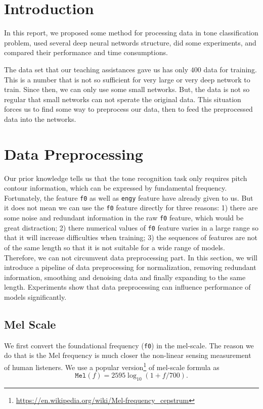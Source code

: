 \documentclass[a4paper]{article}
\begin{document}
\maketitle
\pagebreak

\section{Introduction}

In this report, we proposed some method for processing data in tone classification problem, used several deep neural networds structure, did some experiments, and compared their performance and time consumptions.

The data set that our teaching assistances gave us has only $400$ data for training. This is a number that is not so sufficient for very large or very deep network to train. Since then, we can only use some small networks. But, the data is not so regular that small networks can not sperate the original data. This situation forces us to find some way to preprocess our data, then to feed the preprocessed data into the networks.

\section{Data Preprocessing}

Our prior knowledge tells us that the tone recognition task only requires pitch contour information, which can be expressed by fundamental frequency. Fortunately, the feature \texttt{f0} as well as \texttt{engy} feature have already given to us. But it does not mean we can use the \texttt{f0} feature directly for three reasons: 1) there are some noise and redundant information in the raw \texttt{f0} feature, which would be great distraction; 2) there numerical values of \texttt{f0} feature varies in a large range so that it will increase difficulties when training; 3) the sequences of features are not of the same length so that it is not suitable for a wide range of models. Therefore, we can not circumvent data preprocessing part. In this section, we will introduce a pipeline of data preprocessing for normalization, removing redundant information, smoothing and denoising data and finally expanding to the same length. Experiments show that data preprocessing can influence performance of models significantly.
\subsection{Mel Scale}
We first convert the foundational frequency (\texttt{f0}) in the mel-scale. The reason we do that is the Mel frequency is much closer the non-linear sensing measurement of human listeners. We use a popular version\footnote{\url{https://en.wikipedia.org/wiki/Mel-frequency_cepstrum}} of mel-scale formula as
	\[\mathtt{Mel}(f) = 2595\log_{10}(1+f/ 700).\]
	
\end{document}
